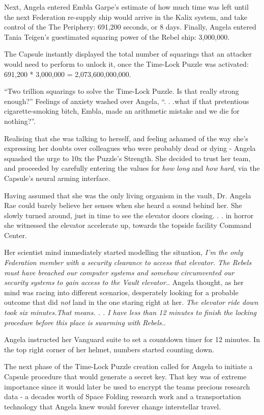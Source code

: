 \documentclass[smalldemyvopaper,11pt,twoside,onecolumn,openright,extrafontsizes]{memoir}
\begin{document}
 
 Next, Angela entered Embla Garpe’s estimate of how much time was left until the next Federation re-supply ship would arrive in the Kalix system, and take control of the The Periphery: 691,200 seconds, or 8 days. Finally, Angela entered Tania Teigen’s guestimated squaring power of the Rebel ship: 3,000,000.

 
  The Capsule instantly displayed the total number of squarings that an attacker would need to perform to unlock it, once the Time-Lock Puzzle was activated: 691,200 * 3,000,000 = 2,073,600,000,000.

 
  “Two trillion squarings to solve the Time-Lock Puzzle. Is that really strong enough?” Feelings of anxiety washed over Angela, “. . .what if that pretentious cigarette-smoking bitch, Embla, made an arithmetic mistake and we die for nothing?”.

 
  Realising that she was talking to herself, and feeling ashamed of the way she’s expressing her doubts over colleagues who were probably dead or dying - Angela squashed the urge to 10x the Puzzle’s Strength. She decided to trust her team, and proceeded by carefully entering the values for \textit{how long} and \textit{how hard}, via the Capsule’s neural arming interface.

Having assumed that she was the only living organism in the vault, Dr. Angela Rae could barely believe her senses when she heard a sound behind her. She slowly turned around, just in time to see the elevator doors closing. . . in horror she witnessed the elevator accelerate up, towards the topside facility Command Center.

 
Her scientist mind immediately started modelling the situation, \textit{I’m the only Federation member with a security clearance to access that elevator. The Rebels must have breached our computer systems and somehow circumvented our security systems to gain access to the Vault elevator.}. Angela thought, as her mind was racing into different scenarios, desperately looking for a probable outcome that did \textit{not} land in the one staring right at her. \textit{The elevator ride down took six minutes.That means. . . I have less than 12 minutes to finish the locking procedure before this place is swarming with Rebels.}.

 
 Angela instructed her Vanguard suite to set a countdown timer for 12 minutes. In the top right corner of her helmet, numbers started counting down.

 
  The next phase of the Time-Lock Puzzle creation called for Angela to initiate a Capsule procedure that would generate a secret key. That key was of extreme importance since it would later be used to encrypt the teams precious research data - a decades worth of Space Folding research work and a transportation technology that Angela knew would forever change interstellar travel.
\end{document}
